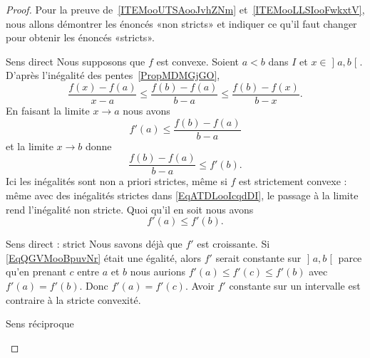 \begin{proof}


    Pour la preuve de~\ref{ITEMooUTSAooJvhZNm} et~\ref{ITEMooLLSIooFwkxtV}, nous allons démontrer les énoncés «non stricts»  et indiquer ce qu'il faut changer pour obtenir les énoncés «stricts».
    \begin{subproof}
    \item[Sens direct]
    Nous supposons que \( f\) est convexe. Soient \( a<b\) dans \( I\) et \( x\in\mathopen] a , b \mathclose[\). D'après l'inégalité des pentes~\ref{PropMDMGjGO},
        \begin{equation}        \label{EqATDLooIcqdDI}
            \frac{ f(x)-f(a) }{ x-a }\leq\frac{ f(b)-f(a) }{ b-a }\leq \frac{ f(b)-f(x) }{ b-x }.
        \end{equation}
        En faisant la limite \( x\to a\) nous avons
        \begin{equation}
            f'(a)\leq \frac{ f(b)-f(a) }{ b-a }
        \end{equation}
        et la limite \( x\to b\) donne
        \begin{equation}
            \frac{ f(b)-f(a) }{ b-a }\leq f'(b).
        \end{equation}
        Ici les inégalités sont non a priori strictes, même si \( f\) est strictement convexe : même avec des inégalités strictes dans \eqref{EqATDLooIcqdDI}, le passage à la limite rend l'inégalité non stricte. Quoi qu'il en soit nous avons
        \begin{equation}        \label{EqQGVMooBpuvNr}
            f'(a)\leq f'(b).
        \end{equation}
    \item[Sens direct : strict]
         Nous savons déjà que \( f'\) est croissante. Si \eqref{EqQGVMooBpuvNr} était une égalité, alors \( f'\) serait constante sur \( \mathopen] a , b \mathclose[\) parce qu'en prenant \( c\) entre \( a\) et \( b\) nous aurions \( f'(a)\leq f'(c)\leq f'(b)\) avec \( f'(a)=f'(b)\). Donc \( f'(a)=f'(c)\). Avoir \( f'\) constante sur un intervalle est contraire à la stricte convexité.

         \item[Sens réciproque]


\end{subproof}
\end{proof}

